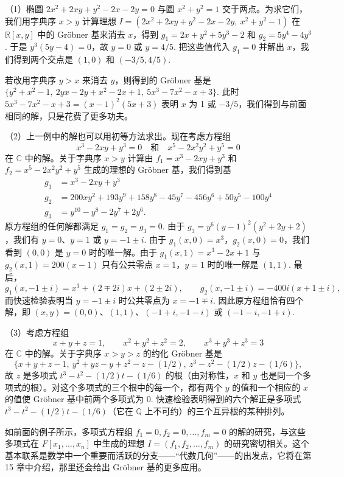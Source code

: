 \begin{example}
（1）椭圆 \(2x^2+2xy+y^2-2x-2y = 0\) 与圆 \(x^2+y^2 = 1\) 交于两点。为求它们，我们用字典序 \(x > y\) 计算理想 \(I = (2x^2+2xy+y^2-2x-2y,\ x^2+y^2-1)\) 在 \(\mathbb{R}[x, y]\) 中的 Gröbner 基来消去 \(x\)，得到 \(g_1 = 2x+y^2+5y^3-2\) 和 \(g_2 = 5y^4-4y^3\). 于是 \(y^3(5y-4) = 0\)，故 \(y = 0\) 或 \(y = 4/5\). 把这些值代入 \(g_1 = 0\) 并解出 \(x\)，我们得到两个交点是 \((1, 0)\) 和 \((-3/5, 4/5)\).

若改用字典序 \(y > x\) 来消去 \(y\)，则得到的 Gröbner 基是 \(\{y^2+x^2-1,\ 2yx-2y+x^2-2x+1,\ 5x^3-7x^2-x+3\}\). 此时 \(5x^3-7x^2-x+3 = (x-1)^2(5x+3)\) 表明 \(x\) 为 1 或 \(-3/5\)，我们得到与前面相同的解，只是花费了更多功夫。

（2）上一例中的解也可以用初等方法求出。现在考虑方程组
\[
x^3-2xy+y^3 = 0 \quad \text{和} \quad x^5-2x^2y^2+y^5 = 0
\]
在 \(\mathbb{C}\) 中的解。关于字典序 \(x > y\) 计算由 \(f_1 = x^3-2xy+y^3\) 和 \(f_2 = x^5-2x^2y^2+y^5\) 生成的理想的 Gröbner 基，我们得到基
\[
\begin{aligned}
g_1 &= x^3-2xy+y^3 \\
g_2 &= 200xy^2+193y^9+158y^8-45y^7-456y^6+50y^5-100y^4 \\
g_3 &= y^{10}-y^8-2y^7+2y^6.
\end{aligned}
\]
原方程组的任何解都满足 \(g_1 = g_2 = g_3 = 0\). 由于 \(g_3 = y^6(y-1)^2(y^2+2y+2)\)，我们有 \(y = 0\)、\(y = 1\) 或 \(y = -1\pm i\). 由于 \(g_1(x, 0) = x^3\)，\(g_2(x, 0) = 0\)，我们看到 \((0,0)\) 是 \(y = 0\) 时的唯一解。由于 \(g_1(x, 1) = x^3-2x+1\) 与 \(g_2(x, 1) = 200(x-1)\) 只有公共零点 \(x = 1\)，\(y = 1\) 时的唯一解是 \((1,1)\). 最后，
\[
g_1(x, -1\pm i) = x^3 + (2\mp 2i)x + (2\pm 2i), \qquad g_2(x, -1\pm i) = -400i(x+1\pm i),
\]
而快速检验表明当 \(y = -1\pm i\) 时公共零点为 \(x = -1\mp i\). 因此原方程组恰有四个解，即 \((x, y) = (0,0)\)、\((1,1)\)、\((-1+i, -1-i)\) 或 \((-1-i, -1+i)\).

（3）考虑方程组
\[
x+y+z = 1, \qquad x^2+y^2+z^2 = 2, \qquad x^3+y^3+z^3 = 3
\]
在 \(\mathbb{C}\) 中的解。关于字典序 \(x > y > z\) 的约化 Gröbner 基是
\[
\{x+y+z-1,\ y^2+yz-y+z^2-z-(1/2),\ z^3-z^2-(1/2)z-(1/6)\},
\]
故 \(z\) 是多项式 \(t^3-t^2-(1/2)t-(1/6)\) 的根（由对称性，\(x\) 和 \(y\) 也是同一个多项式的根）。对这个多项式的三个根中的每一个，都有两个 \(y\) 的值和一个相应的 \(x\) 的值使 Gröbner 基中前两个多项式为 0. 快速检验表明得到的六个解正是多项式 \(t^3-t^2-(1/2)t-(1/6)\)（它在 \(\mathbb{Q}\) 上不可约）的三个互异根的某种排列。
\end{example}

如前面的例子所示，多项式方程组 \(f_1 = 0, f_2 = 0, \ldots, f_m = 0\) 的解的研究，与这些多项式在 \(F[x_1, \ldots, x_n]\) 中生成的理想 \(I = (f_1, f_2, \ldots, f_m)\) 的研究密切相关。这个基本联系是数学中一个重要而活跃的分支——“代数几何”——的出发点，它将在第 15 章中介绍，那里还会给出 Gröbner 基的更多应用。

